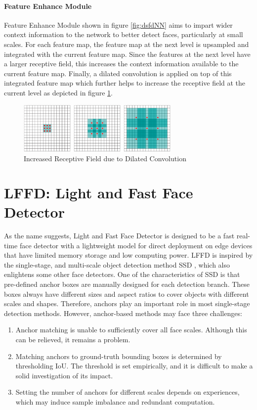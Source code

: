 \paragraph{Feature Enhance Module}
Feature Enhance Module shown in figure \ref{fig:dsfdNN} aims to impart wider context information to the network to better detect faces, particularly at small scales. For each feature map, the feature map at the next level is upsampled and integrated with the current feature map. Since the features at the next level have a larger receptive field, this increases the context information available to the current feature map. Finally, a dilated convolution is applied on top of this integrated feature map which further helps to increase the receptive field at the current level as depicted in figure \ref{fig:dilatConvIncRF}.

\begin{figure}[h]
  \centering
    \includegraphics[width=0.7\textwidth]{LiteratureSurvey/DilatConvIncRF}
    \caption[Dilated Convolution]{Increased Receptive Field due to Dilated Convolution}
    \label{fig:dilatConvIncRF} 
\end{figure}


\section{LFFD: Light and Fast Face Detector}
As the name suggests, Light and Fast Face Detector \cite{lffd2019} is designed to be a fast real-time face detector with a lightweight model for direct deployment on edge devices that have limited memory storage and low computing power. LFFD is inspired by the single-stage, and multi-scale object detection method SSD \cite{ssd2016}, which also enlightens some other face detectors. One of the characteristics of SSD is that pre-defined anchor boxes are manually designed for each detection branch. These boxes always have different sizes and aspect ratios to cover objects with different scales and shapes. Therefore, anchors play an important role in most single-stage detection methods. However, anchor-based methods may face three challenges:
\begin{enumerate}
    \item Anchor matching is unable to sufficiently cover all face scales. Although this can be relieved, it remains a problem.
    \item Matching anchors to ground-truth bounding boxes is determined by thresholding IoU. The threshold is set empirically, and it is difficult to make a solid investigation of its impact.
    \item Setting the number of anchors for different scales depends on experiences, which may induce sample imbalance and redundant computation.
\end{enumerate}

